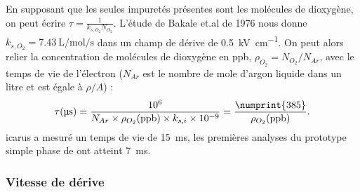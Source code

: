         En supposant que les seules impuretés présentes sont les molécules de dioxygène, on peut écrire $\tau = \frac{1}{k_{s,O_2} N_{O_2}}$. L'étude de Bakale et.al de 1976\cite{Bakale1976} nous donne $k_{s,O_2}=\SI{7.43}{\liter\per\mole\per\second}$ dans un champ de dérive de \SI{0.5}{\kilo\volt\per\centi\meter}. On peut alors relier la concentration de molécules de dioxygène en ppb, $\rho_{O_2}=N_{O_2}/N_{Ar}$, avec le temps de vie de l'électron ($N_{Ar}$ est le nombre de mole d'argon liquide dans un litre et est égale à $\rho/A$) : 
        \begin{equation}
          \tau(\si{\micro\second}) = \frac{10^6}{N_{Ar}\times \rho_{O_2}(\si{ppb}) \times k_{s,i} \times 10^{-9}} = \frac{\numprint{385}}{\rho_{O_2}(\si{ppb})}\label{eq::purity}.
        \end{equation}
        \gls{icarus} a mesuré un temps de vie de \SI{15}{\milli\second}\cite{Antonello2014}, les premières analyses du prototype simple phase de \protosp{} ont atteint \SI{7}{\milli\second}.
        

      \subsubsection{Vitesse de dérive}

